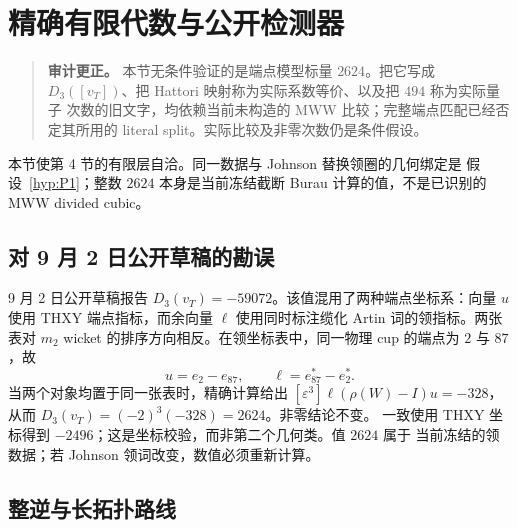 \section{精确有限代数与公开检测器}\label{sec:exact-algebra}

\begin{quote}\small
\textbf{审计更正。} 本节无条件验证的是端点模型标量 $2624$。把它写成
$D_3([v_T])$、把 Hattori 映射称为实际系数等价、以及把 $494$ 称为实际量子
次数的旧文字，均依赖当前未构造的 MWW 比较；完整端点匹配已经否定其所用的
literal split。实际比较及非零次数仍是条件假设。
\end{quote}

本节使第 4 节的有限层自洽。同一数据与 Johnson 替换领圈的几何绑定是
假设~\ref{hyp:P1}；整数 $2624$ 本身是当前冻结截断 Burau 计算的值，不是已识别的 MWW divided cubic。

\subsection{对 9 月 2 日公开草稿的勘误}

9 月 2 日公开草稿报告 $D_3(v_T)=-59072$。该值混用了两种端点坐标系：向量 $u$ 使用
THXY 端点指标，而余向量 $\ell$ 使用同时标注缆化 Artin 词的领指标。两张表对 $m_2$
wicket 的排序方向相反。在领坐标表中，同一物理 cup 的端点为 $2$ 与 $87$，故
\[
  u=e_2-e_{87},\qquad \ell=e_{87}^*-e_2^*.
\]
当两个对象均置于同一张表时，精确计算给出
$[\varepsilon^3]\ell(\rho(W)-I)u=-328$，从而
$D_3(v_T)=(-2)^3(-328)=2624$。非零结论不变。
一致使用 THXY 坐标得到 $-2496$；这是坐标校验，而非第二个几何类。值 $2624$ 属于
当前冻结的领数据；若 Johnson 领词改变，数值必须重新计算。

\subsection{整逆与长拓扑路线}

